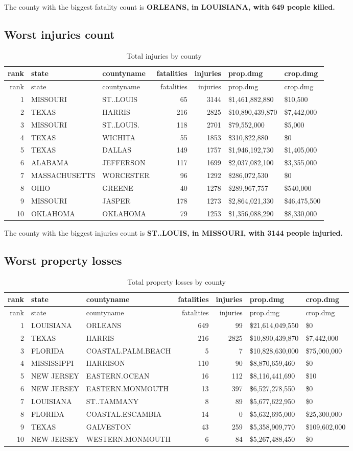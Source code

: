 \documentclass[]{article}
\begin{document}
The county with the biggest fatality count is \textbf{ORLEANS, in
LOUISIANA, with 649 people killed.}

\subsection{Worst injuries count}\label{worst-injuries-count}

\begin{longtable}[]{@{}rllrrll@{}}
\caption{Total injuries by county}\tabularnewline
\toprule
rank & state & countyname & fatalities & injuries & prop.dmg &
crop.dmg\tabularnewline
\midrule
\endfirsthead
\toprule
rank & state & countyname & fatalities & injuries & prop.dmg &
crop.dmg\tabularnewline
\midrule
\endhead
1 & MISSOURI & ST..LOUIS & 65 & 3144 & \$1,461,882,880 &
\$10,500\tabularnewline
2 & TEXAS & HARRIS & 216 & 2825 & \$10,890,439,870 &
\$7,442,000\tabularnewline
3 & MISSOURI & ST..LOUIS. & 118 & 2701 & \$79,552,000 &
\$5,000\tabularnewline
4 & TEXAS & WICHITA & 55 & 1853 & \$310,822,880 & \$0\tabularnewline
5 & TEXAS & DALLAS & 149 & 1757 & \$1,946,192,730 &
\$1,405,000\tabularnewline
6 & ALABAMA & JEFFERSON & 117 & 1699 & \$2,037,082,100 &
\$3,355,000\tabularnewline
7 & MASSACHUSETTS & WORCESTER & 96 & 1292 & \$286,072,530 &
\$0\tabularnewline
8 & OHIO & GREENE & 40 & 1278 & \$289,967,757 & \$540,000\tabularnewline
9 & MISSOURI & JASPER & 178 & 1273 & \$2,864,021,330 &
\$46,475,500\tabularnewline
10 & OKLAHOMA & OKLAHOMA & 79 & 1253 & \$1,356,088,290 &
\$8,330,000\tabularnewline
\bottomrule
\end{longtable}

The county with the biggest injuries count is \textbf{ST..LOUIS, in
MISSOURI, with 3144 people injuried.}

\subsection{Worst property losses}\label{worst-property-losses}

\begin{longtable}[]{@{}rllrrll@{}}
\caption{Total property losses by county}\tabularnewline
\toprule
rank & state & countyname & fatalities & injuries & prop.dmg &
crop.dmg\tabularnewline
\midrule
\endfirsthead
\toprule
rank & state & countyname & fatalities & injuries & prop.dmg &
crop.dmg\tabularnewline
\midrule
\endhead
1 & LOUISIANA & ORLEANS & 649 & 99 & \$21,614,049,550 &
\$0\tabularnewline
2 & TEXAS & HARRIS & 216 & 2825 & \$10,890,439,870 &
\$7,442,000\tabularnewline
3 & FLORIDA & COASTAL.PALM.BEACH & 5 & 7 & \$10,828,630,000 &
\$75,000,000\tabularnewline
4 & MISSISSIPPI & HARRISON & 110 & 90 & \$8,870,659,460 &
\$0\tabularnewline
5 & NEW JERSEY & EASTERN.OCEAN & 16 & 112 & \$8,116,441,690 &
\$10\tabularnewline
6 & NEW JERSEY & EASTERN.MONMOUTH & 13 & 397 & \$6,527,278,550 &
\$0\tabularnewline
7 & LOUISIANA & ST..TAMMANY & 8 & 89 & \$5,677,622,950 &
\$0\tabularnewline
8 & FLORIDA & COASTAL.ESCAMBIA & 14 & 0 & \$5,632,695,000 &
\$25,300,000\tabularnewline
9 & TEXAS & GALVESTON & 43 & 259 & \$5,358,909,770 &
\$109,602,000\tabularnewline
10 & NEW JERSEY & WESTERN.MONMOUTH & 6 & 84 & \$5,267,488,450 &
\$0\tabularnewline
\bottomrule
\end{longtable}
\end{document}
